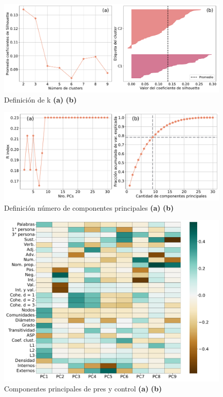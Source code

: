 \begin{figure}[h]
    \centering
    \includegraphics[width = 15cm]{figures/ch03/PCA_clustering/Primer tiempo/silhouette_pres_control.pdf} 
    \caption{Definición de k \textbf{(a)}  \textbf{(b)}}
\label{fig:cap3_defk_controlpres}
\end{figure}

\begin{figure}[h]
    \centering
    \includegraphics[width = 15cm]{figures/ch03/PCA_clustering/Primer tiempo/RindexyPCs_pres_control.pdf} 
    \caption{Definición número de componentes principales \textbf{(a)}  \textbf{(b)}}
\label{fig:cap3_defpcscontrolpres}
\end{figure}

\begin{figure}[h]
    \centering
    \includegraphics[width = 15cm]{figures/ch03/PCA_clustering/Primer tiempo/9PCs_pres_control.pdf} 
    \caption{Componentes principales de pres y control \textbf{(a)}  \textbf{(b)}}
\label{fig:cap3_9PCscontrolpres}
\end{figure}


